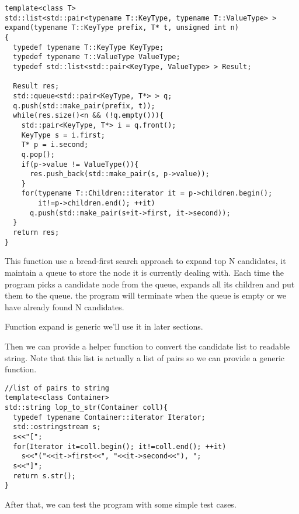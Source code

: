 \documentclass{article}
\begin{document}
\begin{lstlisting}
template<class T>
std::list<std::pair<typename T::KeyType, typename T::ValueType> >
expand(typename T::KeyType prefix, T* t, unsigned int n)
{
  typedef typename T::KeyType KeyType;
  typedef typename T::ValueType ValueType;
  typedef std::list<std::pair<KeyType, ValueType> > Result;

  Result res;
  std::queue<std::pair<KeyType, T*> > q;
  q.push(std::make_pair(prefix, t));
  while(res.size()<n && (!q.empty())){
    std::pair<KeyType, T*> i = q.front();
    KeyType s = i.first;
    T* p = i.second;
    q.pop();
    if(p->value != ValueType()){
      res.push_back(std::make_pair(s, p->value));
    }
    for(typename T::Children::iterator it = p->children.begin();
        it!=p->children.end(); ++it)
      q.push(std::make_pair(s+it->first, it->second));
  }
  return res;
}
\end{lstlisting}

This function use a bread-first search approach to expand top N
candidates, it maintain a queue to store the node it is currently
dealing with. Each time the program picks a candidate node from the
queue, expands all its children and put them to the queue. the program
will terminate when the queue is empty or we have already found N
candidates.

Function expand is generic we'll use it in later sections.

Then we can provide a helper function to convert the candidate
list to readable string. Note that this list is actually a list of pairs so we can
provide a generic function.

\begin{lstlisting}
//list of pairs to string
template<class Container>
std::string lop_to_str(Container coll){
  typedef typename Container::iterator Iterator;
  std::ostringstream s;
  s<<"[";
  for(Iterator it=coll.begin(); it!=coll.end(); ++it)
    s<<"("<<it->first<<", "<<it->second<<"), ";
  s<<"]";
  return s.str();
}
\end{lstlisting}

After that, we can test the program with some simple test cases.
\end{document}
